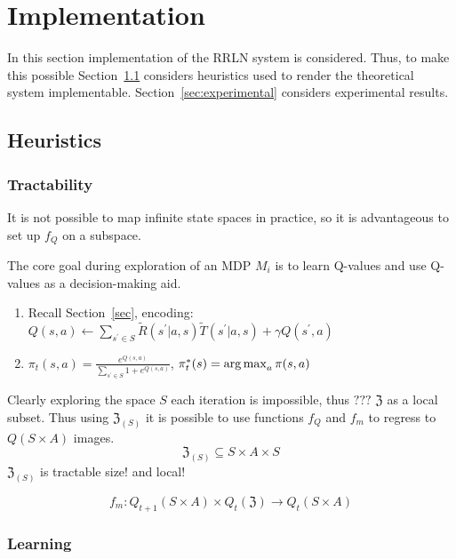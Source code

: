 \section{Implementation}
\label{sec:implementation}

In this section implementation of the RRLN system is considered. Thus, to make this possible Section~\ref{sec:heuristics} considers heuristics used to render the theoretical system implementable. Section~\ref{sec:experimental} considers experimental results.

\subsection{Heuristics}
\label{sec:heuristics}

\subsubsection{Tractability}
\label{sec:tractability}

It is not possible to map infinite state spaces in practice, so it is advantageous to set up $f_Q$ on a 
subspace.

The core goal during exploration of an MDP $M_i$ is to learn Q-values and use Q-values as a decision-making aid. 
\begin{enumerate}[label=\arabic*.]
\item Recall Section~\ref{sec}, encoding: $Q( s, a ) \leftarrow \sum_{s^\prime \in S}\tilde{R}(s^\prime|a,s)\tilde{T}(s^\prime|a,s)+\gamma Q( s^\prime, a )$
\item $\pi_t(s,a) = \frac{e^{Q(s,a)}}{\sum_{s^\prime \in S} 1+e^{Q(s,a)}}$, $\pi^\ast_t(s)=\operatorname*{arg\,max}_{a} \pi( s, a )$
\end{enumerate}
Clearly exploring the space $S$ each iteration is impossible, thus $\mathbf{???}$ $\mathfrak{Z}$ as a local subset. Thus using $\mathfrak{Z}_{(S)}$ it is possible to use functions $f_Q$ and $f_m$ to regress to $Q( S \times A )$ images.
\begin{equation*}
\mathfrak{Z}_{(S)} \subseteq S \times A \times S
\end{equation*}
$\mathfrak{Z}_{(S)}$ is tractable size! and local!

\begin{equation*}
f_m: Q_{t+1}( S \times A ) \times Q_t(\mathfrak{Z}) \rightarrow Q_t(S\times A)
\end{equation*}

\subsubsection{Learning}
\label{sec:learning} 


